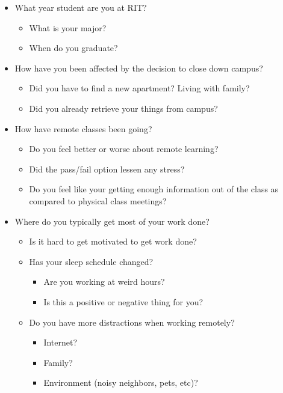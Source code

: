 \documentclass[12pt]{apa6}
\begin{document}
\begin{itemize}
    \item What year student are you at RIT?
    \begin{itemize}
        \item What is your major?
        \item When do you graduate?
    \end{itemize} 
    \item How have you been affected by the decision to close down campus?
    \begin{itemize}
        \item Did you have to find a new apartment? Living with family?
        \item Did you already retrieve your things from campus?
    \end{itemize}
    \item How have remote classes been going?
    \begin{itemize}
        \item Do you feel better or worse about remote learning?
        \item Did the pass/fail option lessen any stress?
        \item Do you feel like your getting enough information out of the class as compared to physical class meetings?
    \end{itemize}
    \item Where do you typically get most of your work done?
    \begin{itemize}
        \item Is it hard to get motivated to get work done?
        \item Has your sleep schedule changed?
            \begin{itemize}
                \item Are you working at weird hours?
                \item Is this a positive or negative thing for you?
            \end{itemize}
        \item Do you have more distractions when working remotely?
        \begin{itemize}
            \item Internet?
            \item Family?
            \item Environment (noisy neighbors, pets, etc)?
        \end{itemize}
    \end{itemize}

\end{itemize}
\end{document}
